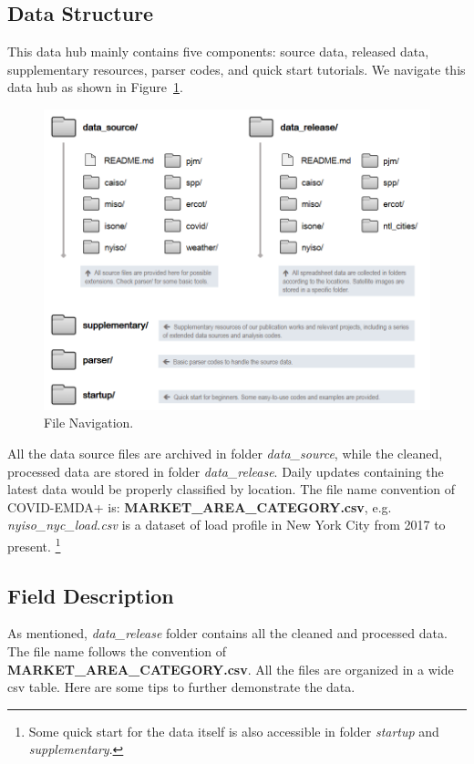 \documentclass[10pt]{article}
\numberwithin{equation}{section}
\numberwithin{table}{section}
\numberwithin{figure}{section}
\begin{document}
\subsection{Data Structure}
This data hub mainly contains five components: source data, released data, supplementary resources, parser codes, and quick start tutorials. We navigate this data hub as shown in Figure~\ref{fig:filenavi}.
\begin{figure}[htbp]
	\centering
	\includegraphics[width=.8\textwidth]{figures/folder-structure-0725.png}
	\caption{File Navigation.}
	\label{fig:filenavi}
\end{figure}


All the data source files are archived in folder \textit{data\_source}, while the cleaned, processed data are stored in folder \textit{data\_release}. Daily updates containing the latest data would be properly classified by location. The file name convention of COVID-EMDA+ is: \textbf{MARKET\_AREA\_CATEGORY.csv}, e.g. \textit{nyiso\_nyc\_load.csv} is a dataset of load profile in New York City from 2017 to present.
\footnote{Some quick start for the data itself is also accessible in folder \textit{startup} and \textit{supplementary}.}

\subsection{Field Description}
As mentioned, \textit{data\_release} folder contains all the cleaned and processed data. The file name follows the convention of \textbf{MARKET\_AREA\_CATEGORY.csv}. 
All the files are organized in a wide csv table. Here are some tips to further demonstrate the data.
\end{document}
